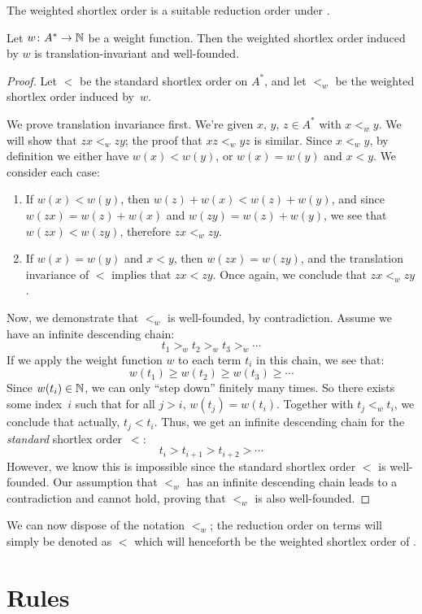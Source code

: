 \documentclass[../generics]{subfiles}
\begin{document}
The weighted shortlex order is a suitable reduction order under .

\begin{proposition} Let $w\colon A^*\rightarrow\mathbb{N}$ be a weight function. Then the weighted shortlex order induced by $w$ is translation-invariant and well-founded.
\end{proposition}
\begin{proof}
Let $<$ be the standard shortlex order on $A^*$, and let $<_w$ be the weighted shortlex order induced by~$w$.

We prove translation invariance first. We're given $x$, $y$, $z\in A^*$ with $x<_w y$. We will show that $zx<_w zy$; the proof that $xz<_w yz$ is similar. Since $x<_w y$, by definition we either have $w(x)<w(y)$, or $w(x)=w(y)$ and $x<y$. We consider each case:
\begin{enumerate}
\item If $w(x)<w(y)$, then $w(z)+w(x)<w(z)+w(y)$, and since $w(zx)=w(z)+w(x)$ and $w(zy)=w(z)+w(y)$, we see that $w(zx)<w(zy)$, therefore $zx <_w zy$.
\item If $w(x)=w(y)$ and $x<y$, then $w(zx)=w(zy)$, and the translation invariance of $<$ implies that $zx<zy$. Once again, we conclude that $zx <_w zy$.
\end{enumerate}
Now, we demonstrate that $<_w$ is well-founded, by contradiction. Assume we have an infinite descending chain:
\[ t_1 >_w t_2 >_w t_3 >_w \cdots \]
If we apply the weight function $w$ to each term $t_i$ in this chain, we see that:
\[ w(t_1) \geq w(t_2) \geq w(t_3) \geq \cdots \]
Since $w(t_i)\in\mathbb{N}$, we can only ``step down'' finitely many times. So there exists some index~$i$ such that for all $j>i$, $w(t_j)=w(t_i)$. Together with $t_j <_w t_i$, we conclude that actually, $t_j < t_i$. Thus, we get an infinite descending chain for the \emph{standard} shortlex order~$<$:
\[ t_i > t_{i+1} > t_{i+2} > \cdots \]
However, we know this is impossible since the standard shortlex order $<$ is well-founded. Our assumption that $<_w$ has an infinite descending chain leads to a contradiction and cannot hold, proving that $<_w$ is also well-founded.
\end{proof}
We can now dispose of the notation $<_w$; the reduction order on terms will simply be denoted as $<$ which will henceforth be the weighted shortlex order of .

\section{Rules}\label{building rules}
\end{document}
